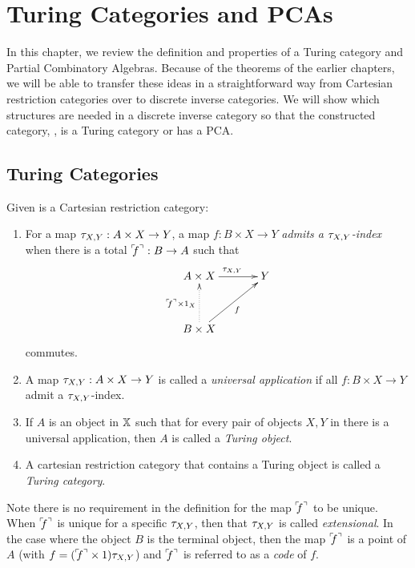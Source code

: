 \chapter{Turing Categories and PCAs} %
\label{chap:turing_categories}

In this chapter, we review the definition and properties of a Turing
category\cite{cockett-hostra08-intro-to-turing} and Partial Combinatory Algebras. Because of the
theorems of the earlier chapters, we will be able to transfer these ideas in a straightforward way
from Cartesian restriction categories over to discrete inverse categories. We will show which
structures are needed in a discrete inverse category \X so that the constructed category, \Xt, is a
Turing category or has a PCA.

\section{Turing Categories}
\label{sec:turing_category_definitions}


\begin{definition}\label{def:turing_category}
  Given \X is a Cartesian restriction category:
  \begin{enumerate}
    \item For a map $\tau_{{X},{Y}}: A \times X \to Y$, a map $f:B\times X \to Y$ \emph{admits a $\tau_{{X},{Y}}$-index}
      when there is a total ${}^\ulcorner\!\!f^\urcorner:B\to A$ such that
      \[
        \xymatrix@C+10pt@R+10pt{
          A\times X \ar[r]^{\txy} & Y \\
          B\times X \ar@{.>}[u]^{\name{f}\times 1_X} \ar[ur]_f
        }
      \]
      commutes.\label{defitem:turing_admit_txy_index}
    \item A map $\tau_{{X},{Y}}: A \times X \to Y$ is called a \emph{universal application} if all
      $f:B\times X \to Y$ admit a $\tau_{{X},{Y}}$-index.\label{defitem:turing_universal_application}
    \item If $A$ is an object in $\mathbb{X}$ such that for every pair of objects $X,Y$ in \X there is
      a universal application, then $A$ is called a \emph{Turing object}.
    \item A cartesian restriction category that contains a Turing object is called a
      \emph{Turing category}.
  \end{enumerate}
\end{definition}

Note there is no requirement in the definition for the map ${}^\ulcorner\!\!f^\urcorner$ to be unique. When ${}^\ulcorner\!\!f^\urcorner$ is unique
for a specific $\tau_{{X},{Y}}$, then that $\tau_{{X},{Y}}$ is called \emph{extensional}. In the case where the object
$B$ is the terminal object, then the map ${}^\ulcorner\!\!f^\urcorner$ is a point of $A$ (with $f = ({}^\ulcorner\!\!f^\urcorner \times 1)\tau_{{X},{Y}}$) and
${}^\ulcorner\!\!f^\urcorner$ is referred to as a \emph{code} of $f$.

